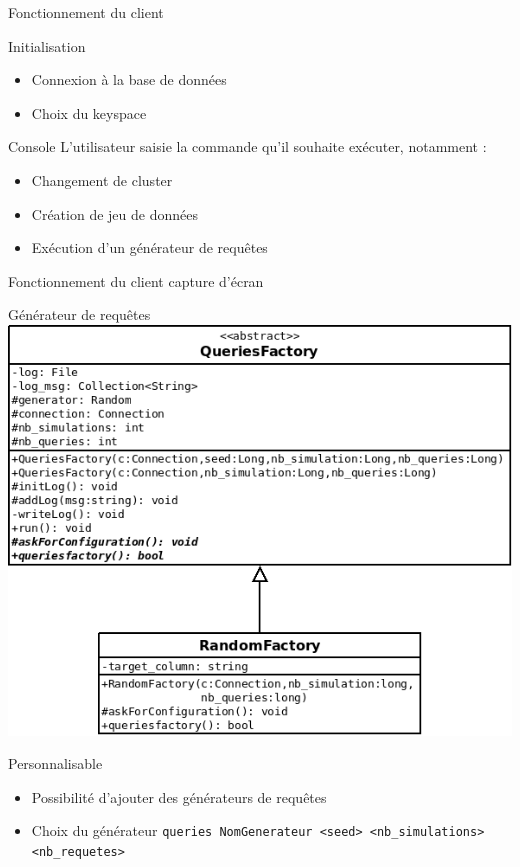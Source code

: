 \documentclass{beamer}
\begin{document}
\begin{frame}{Fonctionnement du client}
  \begin{block}{Initialisation}
    \begin{itemize}
    \item Connexion à la base de données
    \item Choix du keyspace
    \end{itemize}
  \end{block}

  \begin{block}{Console}
  L'utilisateur saisie la commande qu'il souhaite exécuter, notamment :
    \begin{itemize}
    \item Changement de cluster
    \item Création de jeu de données
    \item Exécution d'un générateur de requêtes
    \end{itemize}
  \end{block}
\end{frame}

\begin{frame}{Fonctionnement du client}
  capture d'écran
\end{frame}

\begin{frame}{Générateur de requêtes}
\centering
    \includegraphics[scale=0.25]{architecture_req}


  \begin{block}{Personnalisable}
   \begin{itemize}
    \item Possibilité d'ajouter des générateurs de requêtes
    \item Choix du générateur \newline \texttt{queries NomGenerateur <seed> <nb\_simulations> <nb\_requetes>}
   \end{itemize}
  \end{block}
\end{frame}
\end{document}
